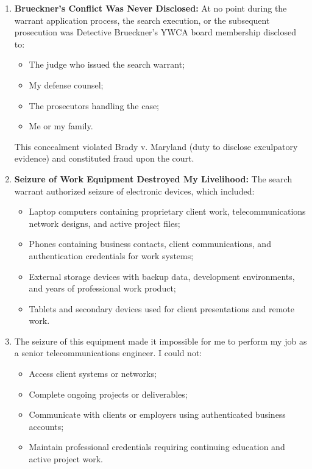 \documentclass[12pt,letterpaper]{article}
\begin{document}
\begin{enumerate}
\begin{itemize}
\item Detective Brueckner had her own undisclosed conflict (YWCA board membership) that violated her duty of candor to the court.
\end{itemize}

\item \textbf{Brueckner's Conflict Was Never Disclosed:} At no point during the warrant application process, the search execution, or the subsequent prosecution was Detective Brueckner's YWCA board membership disclosed to:

\begin{itemize}
\item The judge who issued the search warrant;
\item My defense counsel;
\item The prosecutors handling the case;
\item Me or my family.
\end{itemize}

This concealment violated Brady v. Maryland (duty to disclose exculpatory evidence) and constituted fraud upon the court.

\item \textbf{Seizure of Work Equipment Destroyed My Livelihood:} The search warrant authorized seizure of electronic devices, which included:

\begin{itemize}
\item Laptop computers containing proprietary client work, telecommunications network designs, and active project files;

\item Phones containing business contacts, client communications, and authentication credentials for work systems;

\item External storage devices with backup data, development environments, and years of professional work product;

\item Tablets and secondary devices used for client presentations and remote work.
\end{itemize}

\item The seizure of this equipment made it impossible for me to perform my job as a senior telecommunications engineer. I could not:

\begin{itemize}
\item Access client systems or networks;
\item Complete ongoing projects or deliverables;
\item Communicate with clients or employers using authenticated business accounts;
\item Maintain professional credentials requiring continuing education and active project work.
\end{itemize}


\end{enumerate}
\end{document}
